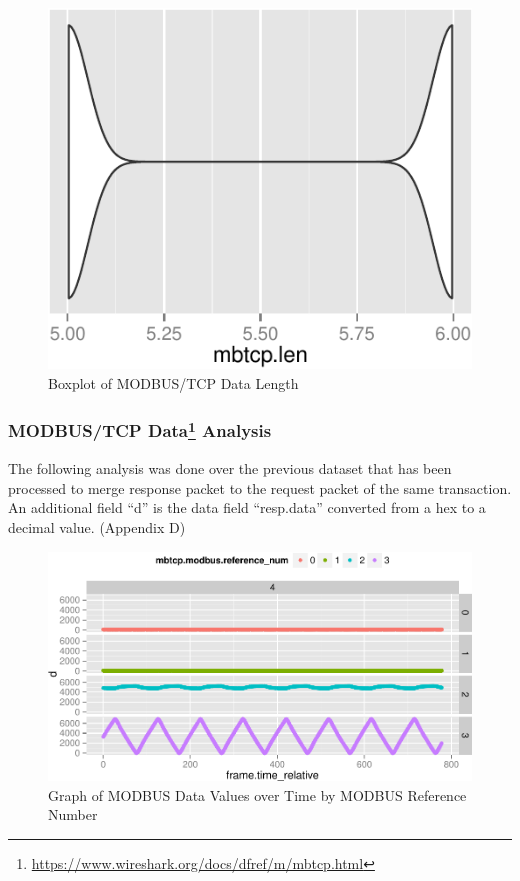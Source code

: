 \documentclass[12pt,]{article}
\begin{document}
\begin{figure}

{\centering \includegraphics{thesis_files/figure-latex/unnamed-chunk-28-1} 

}

\caption{Boxplot of MODBUS/TCP Data Length}\label{fig:unnamed-chunk-28}
\end{figure}

\subsubsection[MODBUS/TCP Data Analysis]{MODBUS/TCP Data\footnote{\url{https://www.wireshark.org/docs/dfref/m/mbtcp.html}}
Analysis}\label{modbustcp-data6-analysis}

The following analysis was done over the previous dataset that has been
processed to merge response packet to the request packet of the same
transaction. An additional field ``d'' is the data field ``resp.data''
converted from a hex to a decimal value. (Appendix D)

\begin{figure}

{\centering \includegraphics{thesis_files/figure-latex/unnamed-chunk-29-1} 

}

\caption{Graph of MODBUS Data Values over Time by MODBUS  Reference Number}\label{fig:unnamed-chunk-29}
\end{figure}
\end{document}
